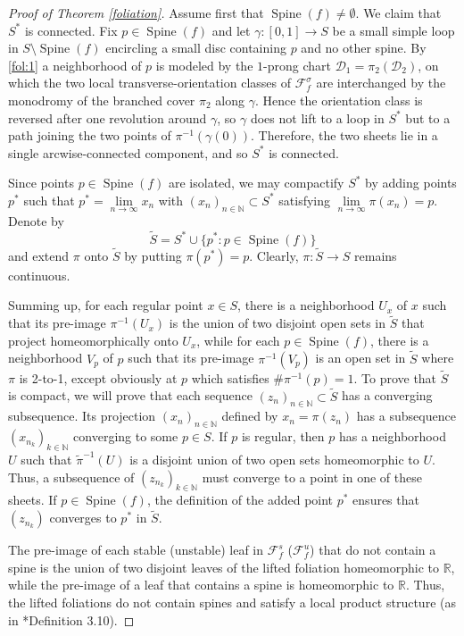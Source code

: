 \documentclass{amsart}
\theoremstyle{plain}
\theoremstyle{definition}
\newcommand{\mc}{\mathcal}
\newcommand{\spine}{\operatorname{Spine}}
\newcommand{\N}{\mathbb{N}}
\newcommand{\R}{\mathbb{R}}
\begin{document}
\begin{proof}[Proof of Theorem \ref{foliation}]
Assume first that $\spine(f)\neq\emptyset$.
We claim that
$S^*$ is connected.  Fix $p\in\spine(f)$ and let $\gamma\colon[0,1]\to S$ be a small simple loop in $S\setminus\spine(f)$ encircling a small disc containing
$p$ and no other spine. By \eqref{fol:1} a neighborhood of $p$ is modeled by the $1$-prong chart
$\mathcal{D}_1=\pi_2(\mathcal{D}_2)$, on which the two local transverse-orientation classes of $\mc{F}^\sigma_f$ are
interchanged by the monodromy of the branched cover $\pi_2$ along $\gamma$. Hence the
orientation class is reversed after one revolution around $\gamma$, so $\gamma$ does not lift
to a loop in $S^*$ but to a path joining the two points of $\pi^{-1}(\gamma(0))$. Therefore, the two sheets lie in a single arcwise-connected component, and so $S^*$ is connected.

Since points $p\in \spine(f)$ are isolated, we may compactify $S^*$ by adding points $p^*$ such that $p^*=\underset{n\to\infty}{\lim} x_n$ with $(x_n)_{n\in\N}\subset S^*$ satisfying $\underset{n\to\infty}{\lim} \pi(x_n)=p$. Denote by 
$$\tilde S=S^*\cup \{p^* : p\in \spine(f)\}$$ and extend $\pi$ onto $\tilde S$ by putting $\pi(p^*)=p$. Clearly, $\pi\colon\tilde S\to S$ remains continuous. 

Summing up, for each regular point $x\in S$, there is a neighborhood 
$U_x$ of $x$ such that its pre-image $\pi^{-1}(U_x)$ is the union of two disjoint open sets in $\widetilde{S}$ that project homeomorphically onto $U_x$, while for each $p\in\spine(f)$, there is a neighborhood $V_p$ of $p$ such that its pre-image $\pi^{-1}(V_p)$ is an open set in $\widetilde{S}$ where $\pi$ is 2-to-1, except obviously at $p$ which satisfies $\#\pi^{-1}(p)=1$. To prove that $\tilde S$ is compact, we will prove that each sequence $(z_n)_{n\in\N}\subset\tilde{S}$ has a converging subsequence. Its projection $(x_n)_{n\in\N}$ defined by $x_n = \pi(z_n)$ has a subsequence $(x_{n_k})_{k\in\N}$ converging to some $p\in S$. If $p$ is regular, then $p$ has a neighborhood $U$ such that $\tilde{\pi}^{-1}(U)$ is a disjoint union of two open sets homeomorphic to $U$. Thus, a subsequence of $(z_{n_k})_{k\in\N}$ must converge to a point in one of these sheets. If $p \in \spine(f)$, the definition of the added point $p^*$ ensures that $(z_{n_k})$ converges to $p^*$ in $\tilde{S}$.


The pre-image of each stable (unstable) leaf in $\mc{F}^s_f$ ($\mc{F}^u_f$) that do not contain a spine is the union of two disjoint leaves of the lifted foliation homeomorphic to $\R$, while the pre-image of a leaf that contains a spine is homeomorphic to $\mathbb{R}$. Thus, the lifted foliations do not contain spines and satisfy a local product structure (as in \cite{APV}*{Definition 3.10}). 


\end{proof}
\end{document}
